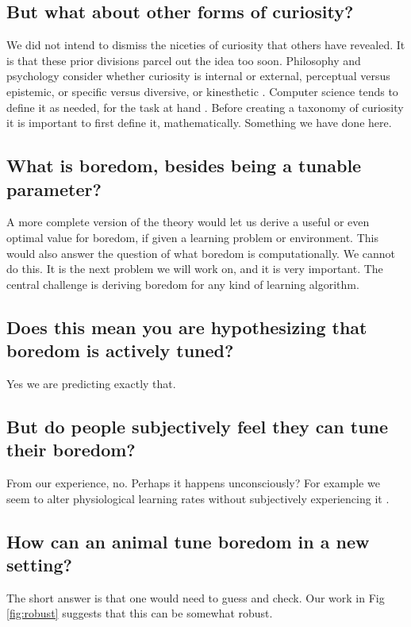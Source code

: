 \subsection*{But what about other forms of curiosity?}
We did not intend to dismiss the niceties of curiosity that others have revealed. It is that these prior divisions parcel out the idea too soon. Philosophy and psychology consider whether curiosity is internal or external, perceptual versus epistemic, or specific versus diversive, or kinesthetic \citep{Kidd2015,Berlyne1950,Zhou2020}. Computer science tends to define it as needed, for the task at hand \citep{Stanley2004,Lehman2011a,Lehman2013,Mouret2015,Colas2020}. Before creating a taxonomy of curiosity it is important to first define it, mathematically. Something we have done here.


\subsection*{What is boredom, besides being a tunable parameter?}
A more complete version of the theory would let us derive a useful or even optimal value for boredom, if given a learning problem or environment. This would also answer the question of what boredom is computationally. We cannot do this. It is the next problem we will work on, and it is very important. The central challenge is deriving boredom for any kind of learning algorithm.


\subsection*{Does this mean you are hypothesizing that boredom is actively tuned?}
Yes we are predicting exactly that.


\subsection*{But do people subjectively feel they can tune their boredom?}
From our experience, no. Perhaps it happens unconsciously? For example we seem to alter physiological learning rates without subjectively experiencing it \citep{Behrens2007}.


\subsection*{How can an animal tune boredom in a new setting?}
The short answer is that one would need to guess and check. Our work in Fig \ref{fig:robust} suggests that this can be somewhat robust.


